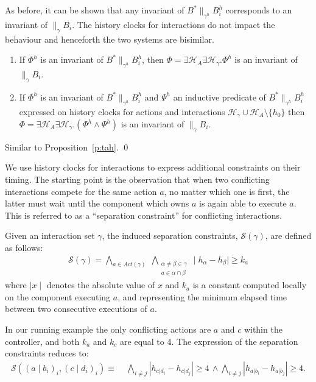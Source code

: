 \documentclass{LMCS}
\newcommand{\hp}{\mathcal{H}_A}
\newcommand{\ha}{\mathcal{H}_{\gamma}}
\newcommand{\cn}{\mathit{B}\xspace}
\newcommand{\sep}{\mathcal{S}}
\newcommand{\te}{h_0}
\newcommand{\compgamma}{B^*}
\newcommand{\sysgammah}{\compgamma \|_{\gamma^h} B_i^h}
\theoremstyle{plain}\newtheorem{remark}[thm]{Remark}
\theoremstyle{plain}\newtheorem{example}[thm]{Example}
\begin{document}
As before, it can be shown that any invariant of $\sysgammah$ corresponds
to an invariant of $\|_{\gamma}\cn_i$.  The history clocks for interactions
do not impact the behaviour and henceforth the two systems are bisimilar.

\begin{prop} \label{p:dtah} \hfill
  \begin{enumerate}
  \item If $\Phi^h$ is an invariant of $\sysgammah$, then $\Phi = \exists \hp \exists \ha. \Phi^h$ is an invariant of $\|_{\gamma}\cn_i$.
  \item If $\Phi^h$ is an invariant of $\sysgammah$ and $\Psi^h$ an inductive predicate of $\sysgammah$
 expressed on history clocks for actions and interactions $\ha \cup \hp \setminus \{\te\}$ then $\Phi = \exists \hp \exists \ha. (\Phi^h \wedge \Psi^h)$ is an invariant of $\|_{\gamma}\cn_i$.
 \end{enumerate}
\end{prop}
\proof Similar to Proposition~\ref{p:tah}.
\qed

We use history clocks for interactions to express additional constraints on
their timing. The starting point is the observation that when two
conflicting interactions compete for the same action $a$, no matter which
one is first, the latter must wait until the component which owns $a$ is
again able to execute $a$. This is referred to as a ``separation
constraint'' for conflicting interactions.

\begin{defi}
\label{def:sep}
Given an interaction set $\gamma$, the induced separation constraints,
$\sep(\gamma)$, are defined as follows:
\begin{align*}
 \sep(\gamma) = \displaystyle{\bigwedge_{a \in Act(\gamma)}}\;\displaystyle{\bigwedge_{\substack{\alpha\neq\beta \in \gamma\\a \in \alpha \cap \beta}}} \mid h_{\alpha} - h_{\beta} \mid \geq k_a
\end{align*} 
where $\mid x \mid$ denotes the absolute value of $x$ and $k_a$ is a
constant computed locally on the component executing $a$, and representing
the minimum elapsed time between two consecutive executions of $a$.
\end{defi}

In our running example the only conflicting actions are $a$ and $c$ within
the controller, and both $k_a$ and $k_c$ are equal to 4. The
expression of the separation constraints reduces to:
\begin{align*}
  \sep( (a\mid b_i)_i, (c\mid d_i)_i) \equiv\; & 
  \displaystyle{\bigwedge_{i\neq j}}|h_{c|d_{i}}-h_{c|d_{j}}|\geq 4\,\wedge
  \displaystyle{\bigwedge_{i\neq j}}|h_{a|b_{i}}-h_{a|b_{j}}|\geq 4.
\end{align*}
\end{document}
